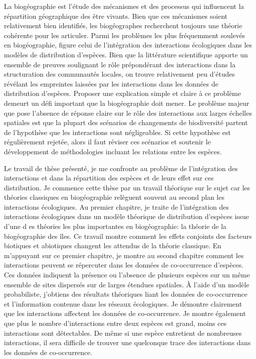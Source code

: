 La biogéographie est l'étude des mécanismes et des processus qui
influencent la répartition géographique des être vivants. Bien que ces
mécanismes soient relativement bien identifiés, les biogéographes
recherchent toujours une théorie cohérente pour les articuler. Parmi les
problèmes les plus fréquemment soulevés en biogéographie, figure celui
de l'intégration des interactions écologiques dans les modèles de
distribution d'espèces. Bien que la littérature scientifique apporte un
ensemble de preuves soulignant le rôle prépondérant des interactions
dans la structuration des communautés locales, on trouve relativement
peu d'études révélant les empreintes laissées par les interactions dans
les données de distribution d'espèces. Proposer une explication simple
et claire à ce problème demeurt un défi important que la biogéographie
doit mener. Le problème majeur que pose l'absence de réponse claire sur
le rôle des interactions aux larges échelles spatiales est que la
plupart des scénarios de changements de biodiversité partent de
l'hypothèse que les interactions sont négligeables. Si cette hypothèse
est régulièrement rejetée, alors il faut réviser ces scénarios et
soutenir le développement de méthodologies incluant les relations entre
les espèces.

Le travail de thèse présenté, je me confronte au problème de
l'intégration des interactions et dans la répartition des espèces et de
leurs effet sur ces distribution. Je commence cette thèse par un travail
théorique sur le sujet car les théories classiques en biogéographie
relèguent souvent au second plan les interactions écologiques. Au
premier chapitre, je traite de l'intégration des interactions
écologiques dans un modèle théorique de distribution d'espèces issue
d'une d es théories les plus importantes en biogéographie: la théorie de
la biogéographie des îles. Ce travail montre comment les effets
conjoints des facteurs biotiques et abiotiques changent les attendus de
la théorie classique. En m'appuyant sur ce premier chapitre, je montre
au second chapitre comment les interactions peuvent se répercuter dans
les données de co-occurrence d'espèces. Ces données indiquent la
présence ou l'absence de plusieurs espèces sur un même ensemble de sites
dispersés sur de larges étendues spatiales. À l'aide d'un modèle
probabiliste, j'obtiens des résultats théoriques liant les données de
co-occurrence et l'information contenue dans les réseaux écologiques. Je
démontre clairement que les interactions affectent les données de
co-occurrence. Je montre également que plus le nombre d'interactions
entre deux espèces est grand, moins ces interactions sont détectables.
De même si une espèce entretient de nombreuses interactions, il sera
difficile de trouver une quelconque trace des interactions dans les
données de co-occurrence.

